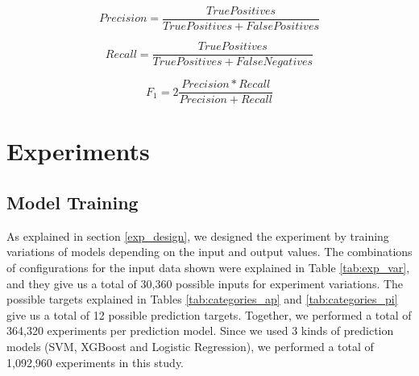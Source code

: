 \documentclass[review]{elsarticle}
\begin{document}
\begin{equation}\label{eq:6}
Precision = \frac{True Positives}{True Positives + False Positives}
\end{equation}

\begin{equation}\label{eq:7}
Recall = \frac{True Positives}{True Positives + False Negatives}
\end{equation}

\begin{equation}\label{eq:8}
F_{1} = 2  \frac{Precision * Recall}{Precision + Recall}
\end{equation}

\section{Experiments}
\label{experiments}

\subsection{Model Training}
\label{model_training}

As explained in section \ref{exp_design}, we designed the experiment by training variations of models depending on the input and output values. The combinations of configurations for the input data shown were explained in Table \ref{tab:exp_var}, and they give us a total of 30,360 possible inputs for experiment variations. The possible targets explained in Tables \ref{tab:categories_ap} and \ref{tab:categories_pi} give us a total of 12 possible prediction targets. Together, we performed a total of 364,320 experiments per prediction model. Since we used 3 kinds of prediction models (SVM, XGBoost and Logistic Regression), we performed a total of 1,092,960 experiments in this study.

\end{document}
